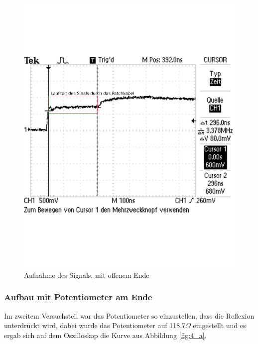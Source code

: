 \documentclass[12pt,a4paper]{article}
\begin{document}
\begin{figure}[H] 
  \centering
    \includegraphics[scale = 0.5]{4_o.pdf}
  	\caption[Aufnahme des Signals, mit offenem Ende]{Aufnahme des Signals, mit offenem Ende}
  \label{fig:4_o}
\end{figure}

\subsubsection{Aufbau mit Potentiometer am Ende}

Im zweitem Versuchsteil war das Potentiometer so einzustellen, dass die Reflexion unterdrückt wird, dabei wurde das Potentiometer auf 118,7$\Omega$ eingestellt und es ergab sich auf dem Oszilloskop die Kurve aus Abbildung \ref{fig:4_a}.
\end{document}
